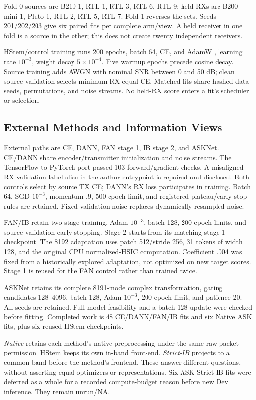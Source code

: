 \documentclass[journal]{IEEEtran}
\begin{document}
Fold 0 sources are B210-1, RTL-1, RTL-3, RTL-6, RTL-9; held RXs are B200-mini-1, Pluto-1, RTL-2, RTL-5, RTL-7. Fold 1 reverses the sets. Seeds 201/202/203 give six paired fits per complete arm/view. A held receiver in one fold is a source in the other; this does not create twenty independent receivers.

HStem/control training runs 200 epochs, batch 64, CE, and AdamW \cite{loshchilov2019adamw}, learning rate $10^{-3}$, weight decay $5\times 10^{-4}$. Five warmup epochs precede cosine decay. Source training adds AWGN with nominal SNR between 0 and 50 dB; clean source validation selects minimum RX-equal CE. Matched fits share hashed data seeds, permutations, and noise streams. No held-RX score enters a fit's scheduler or selection.

\subsection{External Methods and Information Views}
External paths are CE, DANN, FAN stage 1, IB stage 2, and ASKNet. CE/DANN share encoder/transmitter initialization and noise streams. The TensorFlow-to-PyTorch port passed 103 forward/gradient checks. A misaligned RX validation-label slice in the author entrypoint is repaired and disclosed. Both controls select by source TX CE; DANN's RX loss participates in training. Batch 64, SGD $10^{-3}$, momentum .9, 500-epoch limit, and registered plateau/early-stop rules are retained. Fixed validation noise replaces dynamically resampled noise.

FAN/IB retain two-stage training, Adam $10^{-3}$, batch 128, 200-epoch limits, and source-validation early stopping. Stage 2 starts from its matching stage-1 checkpoint. The 8192 adaptation uses patch 512/stride 256, 31 tokens of width 128, and the original CPU normalized-HSIC computation. Coefficient .004 was fixed from a historically explored adaptation, not optimized on new target scores. Stage 1 is reused for the FAN control rather than trained twice.

ASKNet retains its complete 8191-mode complex transformation, gating candidates 128--4096, batch 128, Adam $10^{-3}$, 200-epoch limit, and patience 20. All seeds are retained. Full-model feasibility and a batch 128 update were checked before fitting. Completed work is 48 CE/DANN/FAN/IB fits and six Native ASK fits, plus six reused HStem checkpoints.

\emph{Native} retains each method's native preprocessing under the same raw-packet permission; HStem keeps its own in-band front-end. \emph{Strict-IB} projects to a common band before the method's frontend. These answer different questions, without asserting equal optimizers or representations. Six ASK Strict-IB fits were deferred as a whole for a recorded compute-budget reason before new Dev inference. They remain unrun/NA.
\end{document}
